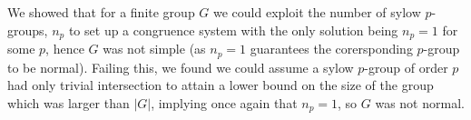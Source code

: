 \begin{recall}
	We showed that for a finite group \(G\) we could exploit the number of sylow \(p\)-groups, \(n_{p}\) to set up a congruence system with the only solution being \(n_{p} = 1\) for some \(p\), hence \(G\) was not simple (as \(n_{p} = 1\) guarantees the corersponding \(p\)-group to be normal). Failing this, we found we could assume a sylow \(p\)-group of order \(p\) had only trivial intersection to attain a lower bound on the size of the group which was larger than \(\left| G \right| \), implying once again that \(n_{p} =1\), so \(G\) was not normal.
\end{recall}
